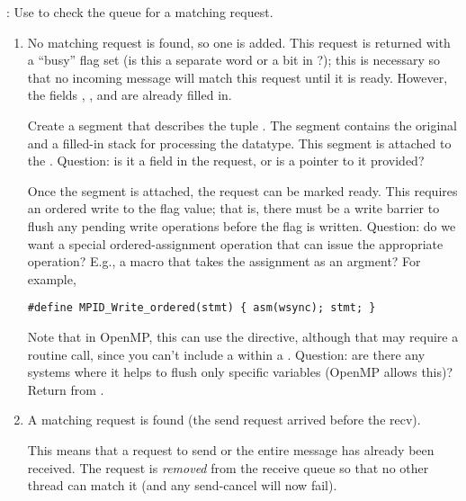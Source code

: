 \begin{mmadi}
\begin{tcp}
:
Use  to check the queue for a matching
request.   
\begin{enumerate}
\item No matching request is found, so one is added.
This request is returned with a ``busy'' flag set (is this a separate word or
a bit  in ?); this is
necessary so that no incoming message will match this request until it is
ready.  However, the fields ,
, and  are already
filled in.  

Create a segment that describes the tuple .
The segment contains the original  and a filled-in
stack  for processing the datatype.  This
segment is attached to the .  Question: is it a field
in the request, or is a pointer to it provided?  

Once the segment is attached, the request can be marked ready.
This requires an ordered write to the flag value; that is, there must be a write barrier to flush any pending write
operations before the flag is written.
Question: do we want a special ordered-assignment operation that can issue the
appropriate operation?  E.g., a  macro that takes
the assignment as an argment?  For example,
\begin{verbatim}
#define MPID_Write_ordered(stmt) { asm(wsync); stmt; }
\end{verbatim}
Note that in OpenMP, this can use the  directive, although that
may require a routine call, since you can't include a  within a
.  Question: are there any systems where it helps to flush only
specific variables  (OpenMP allows this)?
Return from .

\item A matching request is found (the send request arrived before the recv).

This means that a request to send or the entire message has already been
received. 
The request is \emph{removed} from the receive queue so that no other thread
can match it (and any send-cancel will now fail).


\end{enumerate}
\end{tcp}
\end{mmadi}
